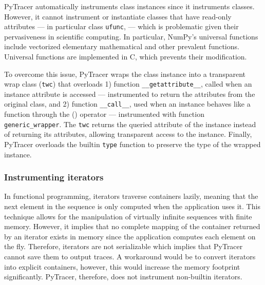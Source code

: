 \documentclass[11pt]{article}
\newcommand{\gkmod}[2]{\color{purple}\sout{#1} #2\color{black}\xspace}
\newcommand{\pytracer}[0]{PyTracer\xspace}
\begin{document}
\pytracer automatically instruments class instances since it instruments classes. However, it cannot instrument or instantiate classes that have read-only attributes --- in particular class \texttt{ufunc}, --- which is problematic given their pervasiveness in scientific computing. In particular, NumPy's universal functions include
vectorized elementary mathematical and other prevalent functions. 
Universal functions are implemented in C, which prevents their modification.

To overcome this issue, \pytracer wraps the class instance into a transparent wrap class (\texttt{twc}) that overloads
1) function \texttt{\_\_getattribute\_\_}, called when an instance attribute is accessed --- instrumented to return the attributes from the original class, and 2) function \texttt{\_\_call\_\_}, used when an instance behaves like a function through the () operator --- instrumented with function \texttt{generic\_wrapper}.
The \texttt{twc} returns the queried attribute of the instance instead of returning its attributes, allowing transparent access to the instance.  Finally, \pytracer overloads the builtin \texttt{type} function to preserve the type of the wrapped instance.

\subsubsection{Instrumenting iterators}

In functional programming, iterators traverse containers lazily, meaning that the next element in the sequence is only computed when the application uses it. This technique allows for the manipulation of virtually infinite sequences with finite memory. However, it implies that no complete mapping of the container returned by an iterator exists in memory since the application computes each element on the fly. Therefore, iterators are not serializable which implies that \pytracer cannot save them to output traces. 
A workaround would be to convert iterators into explicit containers, however, this would increase the memory footprint significantly. \pytracer, therefore, does not instrument non-builtin iterators.
\end{document}
